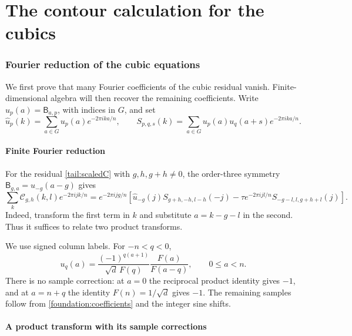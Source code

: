 \documentclass[11pt]{article}
\numberwithin{equation}{section}
\theoremstyle{definition}
\theoremstyle{remark}
\begin{document}
\part{The contour calculation for the cubics}
\label{part:contours}
\section{Fourier reduction of the cubic equations}
\label{an:products}

We first prove that many Fourier coefficients of the cubic residual
vanish.  Finite-dimensional algebra will then recover the remaining
coefficients.  Write $u_p(a)=\mathsf B_{a,p}$,
with indices in $G$, and set
\[
 \widehat u_p(k)=\sum_{a\in G}u_p(a)e^{-2\pi ika/n},\qquad
 S_{p,q,s}(k)=\sum_{a\in G}u_p(a)u_q(a+s)e^{-2\pi ika/n}.
\]
\subsection{Finite Fourier reduction}

For the residual \eqref{tail:scaledC} with $g,h,g+h\ne0$,
the order-three symmetry $\mathsf B_{g,a}=u_{-g}(a-g)$ gives
\begin{equation}
 \sum_k\mathcal C_{g,h}(k,l)e^{-2\pi ijk/n}
 =e^{-2\pi ijg/n}\left[
  \widehat u_{-g}(j)S_{g+h,-h,l-h}(-j)
       -\tau e^{-2\pi ijl/n}S_{-g-l,l,g+h+l}(j)\right].
\label{an:finite}
\end{equation}
Indeed, transform the first term in $k$ and substitute $a=k-g-l$
in the second.  Thus it suffices to relate two product transforms.

We use signed column labels.  For $-n<q<0$,
\begin{equation}
 u_q(a)=\frac{(-1)^{q(a+1)}}{\sqrt d\,F(q)}
                      \frac{F(a)}{F(a-q)},\qquad 0\le a<n.
 \label{an:signed}
\end{equation}
There is no sample correction: at $a=0$ the reciprocal product identity gives
$-1$, and at $a=n+q$ the identity $F(n)=1/\sqrt d$ gives $-1$.
The remaining samples follow from \eqref{foundation:coefficients} and the
integer sine shifts.

\subsection{A product transform with its sample corrections}
\end{document}
